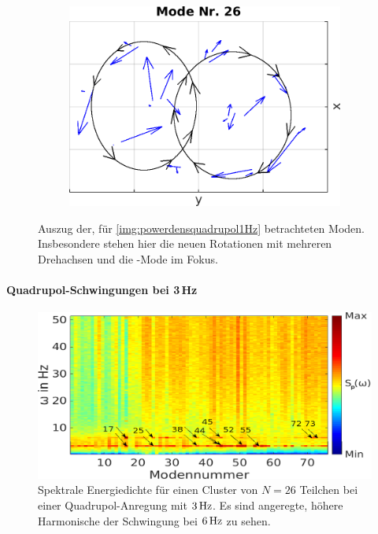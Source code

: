\begin{figure}[!t]
\begin{subfigure}[t]{0.325\textwidth}
              \end{subfigure}
              \begin{subfigure}[t]{0.325\textwidth}
                \centering
                \includegraphics[width=\textwidth,height=0.8\textwidth]{figs/auswertung/manipulation/quadrupol1HzModeNr26.png}
              \end{subfigure}
              \caption{Auszug der, für \autoref{img:powerdensquadrupol1Hz} betrachteten Moden. Insbesondere stehen hier die neuen Rotationen mit mehreren Drehachsen und die -Mode im Fokus.}\label{img:modenquadrupol1Hz}
            \end{figure}


        \paragraph{Quadrupol-Schwingungen bei 3\,Hz}

            \begin{figure}[!b]
              \centering
              \includegraphics[width=\textwidth]{figs/auswertung/manipulation/quadrupol3Hzpowerdens.png}
              \caption{Spektrale Energiedichte für einen Cluster von $N=26$ Teilchen bei einer Quadrupol-Anregung mit $\unit[3]{Hz}$. Es sind angeregte, höhere Harmonische der Schwingung bei $\unit[6]{Hz}$ zu sehen.}\label{img:powerdensquadrupol3Hz}
            \end{figure}

